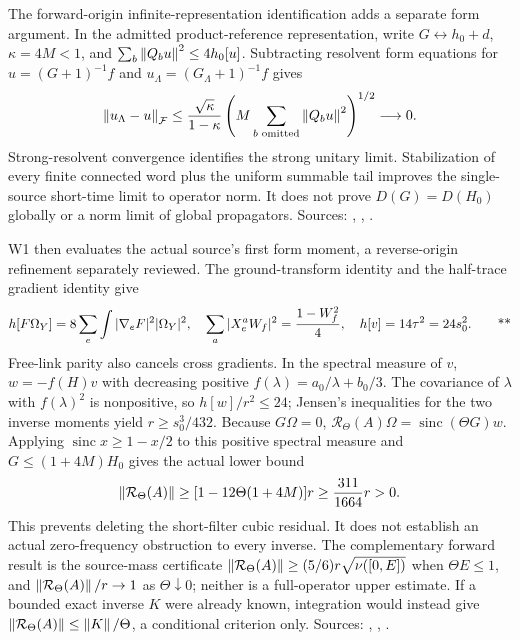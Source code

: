 The forward-origin infinite-representation identification adds a separate
form argument.  In the admitted product-reference representation, write
$G\leftrightarrow h_0+d$, $\kappa=4M<1$, and
$\sum_b\left\lVert Q_bu\right\rVert^2\le4h_0[u]$.  Subtracting resolvent form equations for
$u=(G+1)^{-1}f$ and $u_\Lambda=(G_\Lambda+1)^{-1}f$ gives
\begin{equation}
 \left\lVert u_\Lambda-u\right\rVert_{\mathcal F}
 \le\frac{\sqrt\kappa}{1-\kappa}
 \left(M\sum_{b\text{ omitted}}\left\lVert Q_bu\right\rVert^2\right)^{1/2}\longrightarrow0.
 \label{recent:form-identification}
\end{equation}
Strong-resolvent convergence identifies the strong unitary limit.  Stabilization
of every finite connected word plus the uniform summable tail improves the
single-source short-time limit to operator norm.  It does not prove
$D(G)=D(H_0)$ globally or a norm limit of global propagators.
Sources: ,
,
.

W1 then evaluates the actual source's first form moment, a reverse-origin
refinement separately reviewed.  The ground-transform identity and the
half-trace gradient identity give
\begin{equation}
 h[F\Omega_Y]=8\sum_e\int |\nabla_eF|^2|\Omega_Y|^2,
 \quad\sum_a|X_e^aW_f|^2=\frac{1-W_f^2}{4},\quad
 h[v]=14\tau^2=24s_0^2. \qquad\text{**}
 \label{recent:source-moment}
\end{equation}
Free-link parity also cancels cross gradients.  In the spectral measure of $v$,
$w=-f(H)v$ with decreasing positive $f(\lambda)=a_0/\lambda+b_0/3$.
The covariance of $\lambda$ with $f(\lambda)^2$ is nonpositive, so
$h[w]/r^2\le24$; Jensen's inequalities for the two inverse moments yield
$r\ge s_0^3/432$.  Because $G\Omega=0$,
$\mathcal R_\Theta(A)\Omega=\operatorname{sinc}(\Theta G)w$.
Applying $\operatorname{sinc}x\ge1-x/2$ to this positive spectral measure and
$G\le(1+4M)H_0$ gives the actual lower bound
\begin{equation}
 \left\lVert \mathcal R_\Theta(A)\right\rVert
 \ge[1-12\Theta(1+4M)]r\ge\frac{311}{1664}r>0.
 \label{recent:residual-lower}
\end{equation}
This prevents deleting the short-filter cubic residual.  It does not establish
an actual zero-frequency obstruction to every inverse.  The complementary
forward result is the source-mass certificate
$\left\lVert \mathcal R_\Theta(A)\right\rVert\ge(5/6)r\sqrt{\nu([0,E])}$ when $\Theta E\le1$,
and $\left\lVert \mathcal R_\Theta(A)\right\rVert/r\to1$ as $\Theta\downarrow0$; neither is a
full-operator upper estimate.  If a bounded exact inverse $K$ were already
known, integration would instead give
$\left\lVert \mathcal R_\Theta(A)\right\rVert\le\left\lVert K\right\rVert/\Theta$, a conditional criterion only.
Sources: ,
,
.


